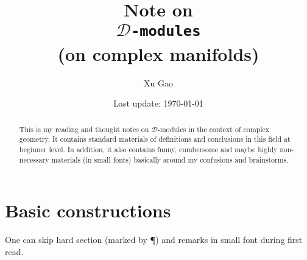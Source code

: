 
	


%
%

%
%
\title{Note on\\ \texttt{\Huge $\mathscr{D}$-modules}\\ (on complex manifolds)}
\author{Xu Gao}
\date{
	Last update: \today
}


\maketitle
\begin{abstract}
This is my reading and thought notes on $\mathscr{D}$-modules 
in the context of complex geometry. 
It contains standard materials of definitions and conclusions in this field 
at beginner level. 
In addition, it also contains funny, cumbersome and maybe highly non-necessary 
materials (in small fonts) basically around my confusions and brainstorms.
\end{abstract}
\tableofcontents


\section{Basic constructions}
One can skip 
hard section (marked by \P) and
remarks in small font   
during first read.




















\begin{bibdiv}
\begin{biblist}
\end{biblist}
\end{bibdiv}
